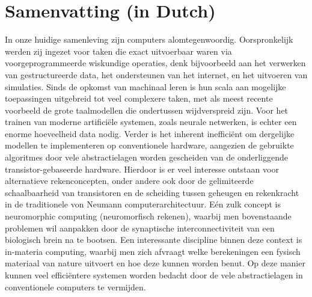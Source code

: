 \chapter*{Samenvatting (in Dutch)}\label{sec:Preface_NL}
In onze huidige samenleving zijn computers alomtegenwoordig.
Oorspronkelijk werden zij ingezet voor taken die exact uitvoerbaar waren via voorgeprogrammeerde wiskundige operaties, denk bijvoorbeeld aan het verwerken van gestructureerde data, het ondersteunen van het internet, en het uitvoeren van simulaties.
Sinds de opkomst van machinaal leren is hun scala aan mogelijke toepassingen uitgebreid tot veel complexere taken, met als meest recente voorbeeld de grote taalmodellen die ondertussen wijdverspreid zijn.
Voor het trainen van moderne artifici\"ele systemen, zoals neurale netwerken, is echter een enorme hoeveelheid data nodig.
Verder is het inherent ineffici\"ent om dergelijke modellen te implementeren op conventionele hardware, aangezien de gebruikte algoritmes door vele abstractielagen worden gescheiden van de onderliggende transistor-gebaseerde hardware.
Hierdoor is er veel interesse ontstaan voor alternatieve rekenconcepten, onder andere ook door de gelimiteerde schaalbaarheid van transistoren en de scheiding tussen geheugen en rekenkracht in de traditionele von Neumann computerarchitectuur.
E\'en zulk concept is neuromorphic computing (neuromorfisch rekenen), waarbij men bovenstaande problemen wil aanpakken door de synaptische interconnectiviteit van een biologisch brein na te bootsen.
Een interessante discipline binnen deze context is in-materia computing, waarbij men zich afvraagt welke berekeningen een fysisch materiaal van nature uitvoert en hoe deze kunnen worden benut.
Op deze manier kunnen veel effici\"entere systemen worden bedacht door de vele abstractielagen in conventionele computers te vermijden. \\ %

